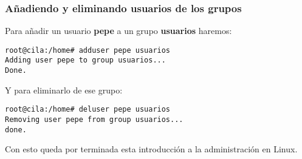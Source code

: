 \subsubsection{Añadiendo y eliminando usuarios de los grupos}

Para añadir un usuario {\bf pepe} a un grupo {\bf usuarios} haremos:

\begin{verbatim}
root@cila:/home# adduser pepe usuarios
Adding user pepe to group usuarios...
Done.
\end{verbatim}

Y para eliminarlo de ese grupo:

\begin{verbatim}
root@cila:/home# deluser pepe usuarios
Removing user pepe from group usuarios...
done.
\end{verbatim}

Con esto queda por terminada  esta introducción a la administración en
Linux.
